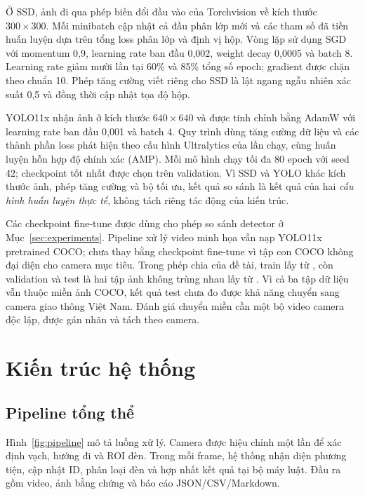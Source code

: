 \documentclass[11pt,a4paper]{article}
\newcommand{\code}[1]{{\small\texttt{\detokenize{#1}}}}
\begin{document}
Ở SSD, ảnh đi qua phép biến đổi đầu vào của Torchvision về kích thước $300\times300$. Mỗi minibatch cập nhật cả đầu phân lớp mới và các tham số đã tiền huấn luyện dựa trên tổng loss phân lớp và định vị hộp. Vòng lặp sử dụng SGD với momentum 0,9, learning rate ban đầu 0,002, weight decay 0,0005 và batch 8. Learning rate giảm mười lần tại 60\% và 85\% tổng số epoch; gradient được chặn theo chuẩn 10. Phép tăng cường viết riêng cho SSD là lật ngang ngẫu nhiên xác suất 0,5 và đồng thời cập nhật tọa độ hộp.

YOLO11x nhận ảnh ở kích thước $640\times640$ và được tinh chỉnh bằng AdamW với learning rate ban đầu 0,001 và batch 4. Quy trình dùng tăng cường dữ liệu và các thành phần loss phát hiện theo cấu hình Ultralytics của lần chạy, cùng huấn luyện hỗn hợp độ chính xác (AMP). Mỗi mô hình chạy tối đa 80 epoch với seed 42; checkpoint tốt nhất được chọn trên validation. Vì SSD và YOLO khác kích thước ảnh, phép tăng cường và bộ tối ưu, kết quả so sánh là kết quả của hai \textit{cấu hình huấn luyện thực tế}, không tách riêng tác động của kiến trúc.

Các checkpoint fine-tune được dùng cho phép so sánh detector ở Mục~\ref{sec:experiments}. Pipeline xử lý video minh họa vẫn nạp YOLO11x pretrained COCO; chưa thay bằng checkpoint fine-tune vì tập con COCO không đại diện cho camera mục tiêu. Trong phép chia của đề tài, train lấy từ \code{train2017}, còn validation và test là hai tập ảnh không trùng nhau lấy từ \code{val2017}. Vì cả ba tập dữ liệu vẫn thuộc miền ảnh COCO, kết quả test chưa đo được khả năng chuyển sang camera giao thông Việt Nam. Đánh giá chuyển miền cần một bộ video camera độc lập, được gán nhãn và tách theo camera.

\section{Kiến trúc hệ thống}
\subsection{Pipeline tổng thể}
Hình~\ref{fig:pipeline} mô tả luồng xử lý. Camera được hiệu chỉnh một lần để xác định vạch, hướng đi và ROI đèn. Trong mỗi frame, hệ thống nhận diện phương tiện, cập nhật ID, phân loại đèn và hợp nhất kết quả tại bộ máy luật. Đầu ra gồm video, ảnh bằng chứng và báo cáo JSON/CSV/Markdown.
\end{document}
